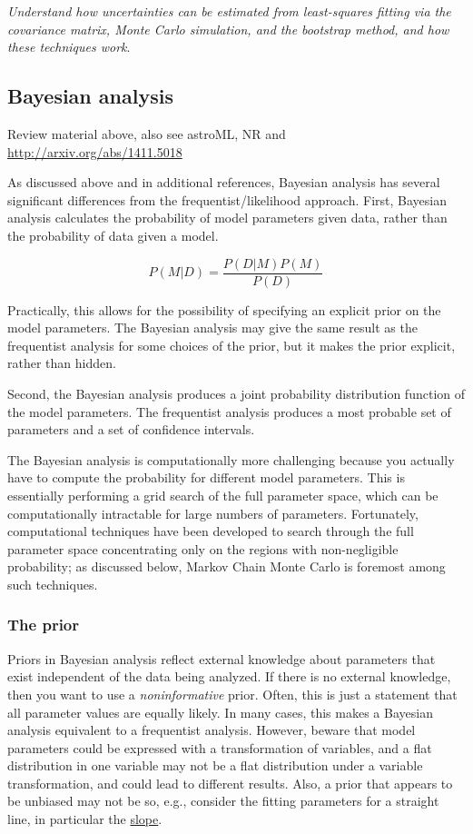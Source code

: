 \documentclass[12pt]{article}
\begin{document}
\emph{Understand how uncertainties can be estimated from least-squares
fitting via the covariance matrix, Monte Carlo simulation, and the
bootstrap method, and how these techniques work}.

\subsection{Bayesian analysis}

Review material above, also see astroML, NR and
\url{http://arxiv.org/abs/1411.5018}

As discussed above and in additional references, Bayesian analysis has
several significant differences from the frequentist/likelihood
approach. First, Bayesian analysis calculates the probability of model
parameters given data, rather than the probability of data given a
model.

$$ P(M|D) = \frac{P(D|M)P(M)}{P(D)} $$

Practically, this allows for the possibility of specifying an explicit
prior on the model parameters. The Bayesian analysis may give the same
result as the frequentist analysis for some choices of the prior, but
it makes the prior explicit, rather than hidden.

Second, the Bayesian analysis produces a joint probability
distribution function of the model parameters. The frequentist
analysis produces a most probable set of parameters and a set of
confidence intervals.

The Bayesian analysis is computationally more challenging because you
actually have to compute the probability for different model
parameters. This is essentially performing a grid search of the full
parameter space, which can be computationally intractable for large
numbers of parameters. Fortunately, computational techniques have been
developed to search through the full parameter space concentrating
only on the regions with non-negligible probability; as discussed
below, Markov Chain Monte Carlo is foremost among such techniques.


\subsubsection{The prior}
Priors in Bayesian analysis reflect external knowledge about
parameters that exist independent of the data being analyzed. If there
is no external knowledge, then you want to use a \emph{noninformative} prior.
Often, this is just a statement that all parameter values are equally
likely. In many cases, this makes a Bayesian analysis equivalent to a
frequentist analysis. However, beware that model parameters could be
expressed with a transformation of variables, and a flat distribution
in one variable may not be a flat distribution under a variable
transformation, and could lead to different results. Also, a prior
that appears to be unbiased may not be so, e.g., consider the fitting
parameters for a straight line, in particular the
\href{http://astronomy.nmsu.edu/holtz/a575/images/slope.png}
{slope}.
\end{document}
